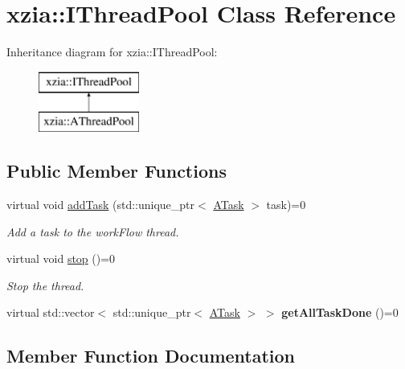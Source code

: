 \hypertarget{classxzia_1_1IThreadPool}{}\section{xzia\+:\+:I\+Thread\+Pool Class Reference}
\label{classxzia_1_1IThreadPool}
Inheritance diagram for xzia\+:\+:I\+Thread\+Pool\+:\begin{figure}[H]
\begin{center}
\leavevmode
\includegraphics[height=2.000000cm]{classxzia_1_1IThreadPool}
\end{center}
\end{figure}
\subsection*{Public Member Functions}
\begin{DoxyCompactItemize}
\item 
virtual void \mbox{\hyperlink{classxzia_1_1IThreadPool_adf16985d0215c0cfafe57f3c056d2983}{add\+Task}} (std\+::unique\+\_\+ptr$<$ \mbox{\hyperlink{classxzia_1_1ATask}{A\+Task}} $>$ task)=0
\begin{DoxyCompactList}\small\item\em Add a task to the work\+Flow thread. \end{DoxyCompactList}\item 
\mbox{\label{classxzia_1_1IThreadPool_add8ae9a80915f75f55ebdb25786cedf4}} 
virtual void \mbox{\hyperlink{classxzia_1_1IThreadPool_add8ae9a80915f75f55ebdb25786cedf4}{stop}} ()=0
\begin{DoxyCompactList}\small\item\em Stop the thread. \end{DoxyCompactList}\item 
\mbox{\label{classxzia_1_1IThreadPool_af48f08840decdd834631d9ec5648cf36}} 
virtual std\+::vector$<$ std\+::unique\+\_\+ptr$<$ \mbox{\hyperlink{classxzia_1_1ATask}{A\+Task}} $>$ $>$ {\bfseries get\+All\+Task\+Done} ()=0
\end{DoxyCompactItemize}


\subsection{Member Function Documentation}
\mbox{\label{classxzia_1_1IThreadPool_adf16985d0215c0cfafe57f3c056d2983}} 
